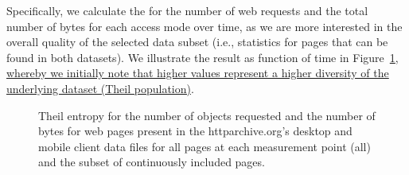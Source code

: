 \documentclass[onecolumn,12pt]{IEEEtran}
\begin{document}
Specifically, we calculate the for the number of web requests and the total number of bytes for each access mode over time, as we are more interested in the overall quality of the selected data subset (i.e., statistics for pages that can be found in both datasets).
We illustrate the result as function of time in Figure~\ref{fig:theil}\uline{, whereby we initially note that higher values represent a higher diversity of the underlying dataset (Theil population)}.
\begin{figure}
	\centering
	\qquad
	\caption{Theil entropy for the number of objects requested and the number of bytes for web pages present in the httparchive.org's desktop and mobile client data files for all pages at each measurement point (all) and the subset of continuously included pages.}
	\label{fig:theil}
\end{figure}
\end{document}
